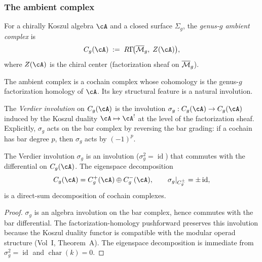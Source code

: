 \subsubsection{The ambient complex}

\begin{definition}
For a chirally Koszul algebra $\cA$ and a closed surface
$\Sigma_g$, the \emph{genus-$g$ ambient complex} is
\[
C_g(\cA)
\;:=\;
R\Gamma\!\bigl(\Mbar_g,\; Z(\cA)\bigr),
\]
where $Z(\cA)$ is the chiral center (factorization sheaf on
$\overline{\mathcal{M}}_g$).
\end{definition}

The ambient complex is a cochain complex whose cohomology is
the genus-$g$ factorization homology of $\cA$.
Its key structural feature is a natural involution.

\begin{definition}
The \emph{Verdier involution} on $C_g(\cA)$ is the involution
$\sigma_g : C_g(\cA) \to C_g(\cA)$
induced by the Koszul duality $\cA \mapsto \cA^!$ at the level
of the factorization sheaf.
Explicitly, $\sigma_g$ acts on the bar complex by reversing the
bar grading: if a cochain has bar degree $p$, then
$\sigma_g$ acts by $(-1)^p$.
\end{definition}

\begin{proposition}
\label{prop:tholog-eigenspace-decomposition}
The Verdier involution $\sigma_g$ is an involution
($\sigma_g^2 = \operatorname{id}$) that commutes with the
differential on $C_g(\cA)$.
The eigenspace decomposition
\[
C_g(\cA) = C_g^+(\cA) \oplus C_g^-(\cA),
\qquad
\sigma_g|_{C_g^\pm} = \pm\operatorname{id},
\]
is a direct-sum decomposition of cochain complexes.
\end{proposition}

\begin{proof}
$\sigma_g$ is an algebra involution on the bar complex, hence
commutes with the bar differential.
The factorization-homology pushforward preserves this involution
because the Koszul duality functor is compatible with the modular
operad structure (Vol~I, Theorem~A).
The eigenspace decomposition is immediate from $\sigma_g^2 = \operatorname{id}$
and $\operatorname{char}(k) = 0$.
\end{proof}

